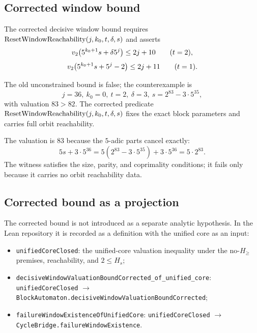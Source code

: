 \subsection{Corrected window bound}

The corrected decisive window bound requires
$\mathrm{ResetWindowReachability}(j,k_0,t,\delta,s)$ and asserts
\begin{equation*}
  v_2\!\left(5^{k_0+1}s+\delta5^j\right)\le2j+10
\qquad(t=2),
\end{equation*}
\begin{equation*}
  v_2\!\left(5^{k_0+1}s+5^j-2\right)\le2j+11
\qquad(t=1).
\end{equation*}

The old unconstrained bound is false; the counterexample is
\begin{equation*}
  j=36,\ k_0=0,\ t=2,\ \delta=3,\
  s=2^{83}-3\cdot5^{35},
\end{equation*}
with valuation $83>82$.  The corrected predicate
$\mathrm{ResetWindowReachability}(j,k_0,t,\delta,s)$ fixes the exact block parameters and
carries full orbit reachability.

The valuation is 83 because the $5$-adic parts cancel exactly:
\begin{equation*}
  5s+3\cdot5^{36}
    =5(2^{83}-3\cdot5^{35})+3\cdot5^{36}
    =5\cdot2^{83}.
\end{equation*}
The witness satisfies the size, parity, and coprimality conditions;
it fails only because it carries no orbit reachability data.

\subsection{Corrected bound as a projection}

The corrected bound is not introduced as a separate analytic
hypothesis.  In the Lean repository it is recorded as a definition
with the unified core as an input:
\begin{itemize}[leftmargin=*]
\item \texttt{unifiedCoreClosed}: the unified-core valuation
  inequality under the no-$H_{\ge}$ premises, reachability, and
  $2\le H_s$;
\item \texttt{decisiveWindowValuationBoundCorrected\_of\_unified\_core}:
  \texttt{unifiedCoreClosed} $\to$
  \texttt{BlockAutomaton.decisiveWindowValuationBoundCorrected};
\item \texttt{failureWindowExistenceOfUnifiedCore}:
  \texttt{unifiedCoreClosed} $\to$
  \texttt{CycleBridge.failureWindowExistence}.
\end{itemize}

